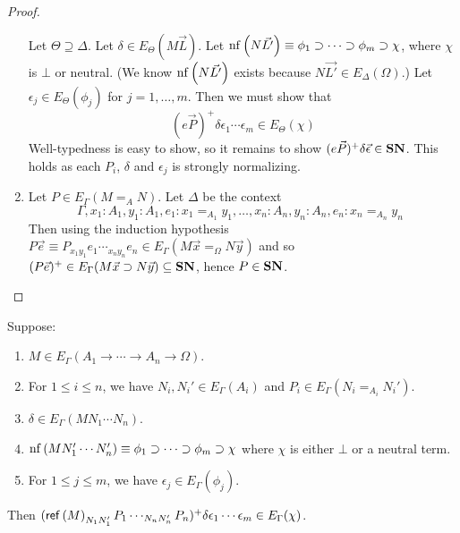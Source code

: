 \begin{proof}
\begin{enumerate}
Let $\Theta \supseteq \Delta$.  Let $\delta \in E_\Theta(M \vec{L})$.
Let $\mathrm{nf} \left( {N \vec{L'}} \right) \equiv \phi_1 \supset \cdots \supset \phi_m \supset \chi$,
where $\chi$ is $\bot$ or neutral.  (We know $\mathrm{nf} \left( {N \vec{L'}} \right)$ exists because
$N \vec{L'} \in E_\Delta(\Omega)$.)  Let $\epsilon_j \in E_\Theta(\phi_j)$ for
$j = 1, \ldots, m$.  Then we must show that
\[ (e \vec{P})^+ \delta \epsilon_1 \cdots \epsilon_m \in E_\Theta(\chi) \]
Well-typedness is easy to show, so it remains to show $(e \vec{P})^+ \delta \vec{\epsilon} \in \mathbf{SN}$.  This holds as each $P_i$, $\delta$ and $\epsilon_j$ is
strongly normalizing.
\item
Let $P \in E_\Gamma(M =_A N)$.  Let $\Delta$ be the context
\[ \Gamma, x_1 : A_1, y_1 : A_1, e_1 : x_1 =_{A_1} y_1, \ldots, x_n : A_n, y_n : A_n, e_n : x_n =_{A_n} y_n \enspace \]
Then using the induction hypothesis $P \vec{e} \equiv P_{x_1 y_1} e_1 \cdots_{x_n y_n} e_n \in E_\Gamma(M \vec{x} =_\Omega N \vec{y})$ and so
$(P \vec{e})^+ \in E_\Gamma(M \vec{x} \supset N \vec{y}) \subseteq \mathbf{SN}$, hence $P \in \mathbf{SN}$.
\end{enumerate}
\end{proof}

\begin{lm}
Suppose:
\begin{enumerate}
\item
$M \in E_\Gamma(A_1 \rightarrow \cdots \rightarrow A_n \rightarrow \Omega)$.
\item
For $1 \leq i \leq n$, we have $N_i, N_i' \in E_\Gamma(A_i)$ and $P_i \in E_\Gamma(N_i =_{A_i} N_i')$.
\item
$\delta \in E_\Gamma(M N_1 \cdots N_n)$.
\item
$\mathrm{nf} \left( {M N_1' \cdots N_n'} \right) \equiv \phi_1 \supset \cdots \supset \phi_m \supset \chi$ where $\chi$
is either $\bot$ or a neutral term.
\item
For $1 \leq j \leq m$, we have $\epsilon_j \in E_\Gamma(\phi_j)$.
\end{enumerate}
Then $(\mathsf{ref} \left( {M} \right)_{N_1 N_1'} P_1 \cdots_{N_n N_n'} P_n)^+ \delta \epsilon_1 \cdots \epsilon_m \in E_\Gamma(\chi)$.
\end{lm}

